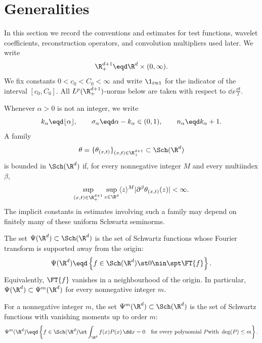 \section{Generalities}\label{sec:generalities}

{} {}

In this section we record the conventions and estimates for test functions,
wavelet coefficients, reconstruction operators, and convolution multipliers
used later. We write
\[ \R^{d + 1}_+ \eqd \R^d \times (0, \infty) . \]
We fix constants $0 < c_0 < C_0 < \infty$ and write $\1_{t \approx 1}$ for the
indicator of the interval $[c_0, C_0]$. All $L^p (\R^{d + 1}_+)$-norms below
are taken with respect to $\dd x \frac{\dd t}{t}$.

Whenever $\alpha > 0$ is not an integer, we write
\[ k_{\alpha} \eqd \lfloor \alpha \rfloor, \qquad \sigma_{\alpha} \eqd \alpha
   - k_{\alpha} \in (0, 1), \qquad n_{\alpha} \eqd k_{\alpha} + 1. \]
A family
\[ \theta = \{\theta_{(x, t)} \}_{(x, t) \in \R^{d + 1}_+} \subset \Sch (\R^d)
\]
is bounded in $\Sch (\R^d)$ if, for every nonnegative integer $M$ and every
multiindex $\beta$,
\[ \sup_{(x, t) \in \R^{d + 1}_+} \sup_{z \in \R^d} \langle z \rangle^M  |
   \partial^{\beta} \theta_{(x, t)} (z) | < \infty . \]
The implicit constants in estimates involving such a family may depend on
finitely many of these uniform Schwartz seminorms.

\begin{definition}
  \label{def:psi-classes}The set $\Psi (\R^d) \subset \Sch (\R^d)$ is the set
  of Schwartz functions whose Fourier transform is supported away from the
  origin:
  \begin{equation}
    \label{eq:psi-fourier-support} \Psi (\R^d) \eqd \left\{ f \in \Sch (\R^d)
    \st 0 \nin \spt \FT{f} \right\} .
  \end{equation}
  Equivalently, $\FT{f}$ vanishes in a neighbourhood of the origin. In
  particular, $\Psi (\R^d) \subset \Psi^m (\R^d)$ for every nonnegative
  integer $m$.
  
  For a nonnegative integer $m$, the set $\Psi^m (\R^d) \subset \Sch (\R^d)$
  is the set of Schwartz functions with vanishing moments up to order $m$:
  \begin{equation}
    \label{eq:psi-vanishing-moments} \Psi^m (\R^d) \eqd \left\{ f \in \Sch
    (\R^d) \st \int_{\R^d} f (x) P (x) \hspace{0.17em} \dd x = 0 \quad
    \text{for every polynomial } P \text{with } \deg (P) \le m \right\} .
  \end{equation}
\end{definition}

